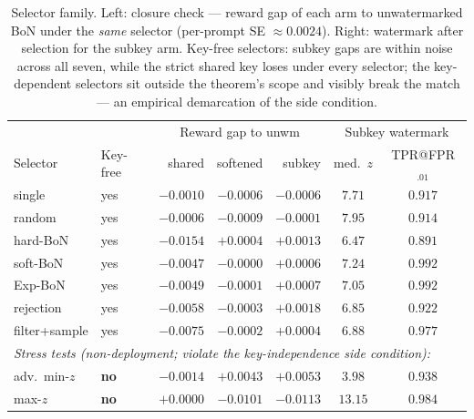 \documentclass{article} %
\begin{document}
\begin{table}[h]
\caption{Selector family. Left: closure check --- reward gap of each arm to
unwatermarked BoN under the \emph{same} selector (per-prompt SE
$\approx0.0024$). Right: watermark after selection for the subkey arm.
Key-free selectors: subkey gaps are within noise across all seven, while the
strict shared key loses under every selector; the key-dependent selectors sit
outside the theorem's scope and visibly break the match --- an empirical
demarcation of the side condition.}
\label{tab:selectors}
\begin{center}
\small
\setlength{\tabcolsep}{4.5pt}
\begin{tabular}{llrrr|cc}
\toprule
 & & \multicolumn{3}{c|}{Reward gap to unwm} &
 \multicolumn{2}{c}{Subkey watermark} \\
Selector & Key-free & shared & softened & subkey & med.\ $z$ & TPR@FPR$_{.01}$ \\
\midrule
single        & yes & $-0.0010$ & $-0.0006$ & $-0.0006$ & $7.71$ & $0.917$ \\
random        & yes & $-0.0006$ & $-0.0009$ & $-0.0001$ & $7.95$ & $0.914$ \\
hard-BoN      & yes & $-0.0154$ & $+0.0004$ & $+0.0013$ & $6.47$ & $0.891$ \\
soft-BoN      & yes & $-0.0047$ & $-0.0000$ & $+0.0006$ & $7.24$ & $0.992$ \\
Exp-BoN       & yes & $-0.0049$ & $-0.0001$ & $+0.0007$ & $7.05$ & $0.992$ \\
rejection     & yes & $-0.0058$ & $-0.0003$ & $+0.0018$ & $6.85$ & $0.922$ \\
filter+sample & yes & $-0.0075$ & $-0.0002$ & $+0.0004$ & $6.88$ & $0.977$ \\
\midrule
\multicolumn{7}{l}{\emph{Stress tests (non-deployment; violate the key-independence side condition):}} \\
adv.\ min-$z$ & \textbf{no} & $-0.0014$ & $+0.0043$ & $+0.0053$ & $3.98$ & $0.938$ \\
max-$z$       & \textbf{no} & $+0.0000$ & $-0.0101$ & $-0.0113$ & $13.15$ & $0.984$ \\
\bottomrule
\end{tabular}
\end{center}
\end{table}
\end{document}

